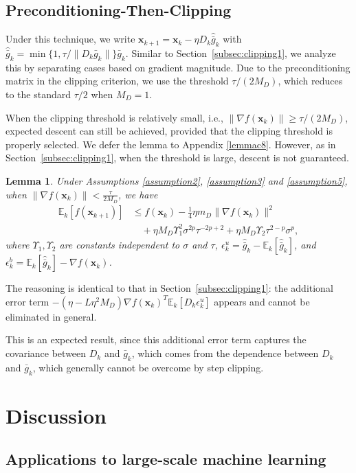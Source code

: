 \documentclass{article}
\newcommand{\bx}{\boldsymbol{x}}
\newcommand{\barg}{\bar{g}}
\theoremstyle{plain}
\newtheorem{lemma}[theorem]{Lemma}
\theoremstyle{definition}
\theoremstyle{remark}
\begin{document}
\subsection{Preconditioning-Then-Clipping}\label{subsec:clipping2}
Under this technique, we write $\bx_{k+1} = \bx_k -\eta D_k\widehat{\barg}_k$ with $\widehat{\barg}_k = \min\{1, \tau/\|D_k\barg_k\|\}\barg_k$. Similar to Section~\ref{subsec:clipping1}, we analyze this by separating cases based on gradient magnitude. Due to the preconditioning matrix in the clipping criterion, we use the threshold $\tau/(2M_D)$, which reduces to the standard $\tau/2$ when $M_D = 1$.

When the clipping threshold is relatively small, i.e., $\|\nabla f(\bx_k)\|\geq  \tau/(2M_D)$, expected descent can still be achieved, provided that the clipping threshold is properly selected. We defer the lemma to Appendix \ref{lemmac8}. However, as in Section~\ref{subsec:clipping1}, when the threshold is large, descent is not guaranteed.
\begin{lemma}
 Under Assumptions \ref{assumption2}, \ref{assumption3} and \ref{assumption5}, 
    when $\|\nabla f(\bx_k)\|< \frac{\tau}{2M_D}$, we have \begin{align*}
      \mathbb{E}_k[ f(\bx_{k+1}) ] & \le f(\bx_k) - \frac{1}{4} \eta m_D \|\nabla f(\bx_k)\|^2 \\
      & \quad + \eta M_D \Upsilon_1^2 \sigma^{2p}\tau^{-2p+2} +  \eta M_D \Upsilon_2 \tau^{2-p}\sigma^p,
\end{align*}
where $\Upsilon_1,\Upsilon_2$ are constants independent to $\sigma$ and $\tau$, $\epsilon_k^u=\widehat{\barg}_k-\mathbb{E}_k[\widehat{\barg}_k]$, and $\epsilon_k^b=\mathbb{E}_k[\widehat{\barg}_k]-\nabla f(\bx_k)$.
\end{lemma}
The reasoning is identical to that in Section~\ref{subsec:clipping1}: the additional error term $-(\eta - L\eta^2 M_D)\nabla f(\bx_k)^T\mathbb{E}_k[D_k\epsilon_k^u]$ appears and cannot be eliminated in general. 

This is an expected result, since this additional error term captures the covariance between $D_k$ and $\barg_k$, which comes from the dependence between $D_k$ and $\barg_k$, which generally cannot be overcome by step clipping.
\section{Discussion}

\subsection{Applications to large-scale machine learning}
\end{document}
